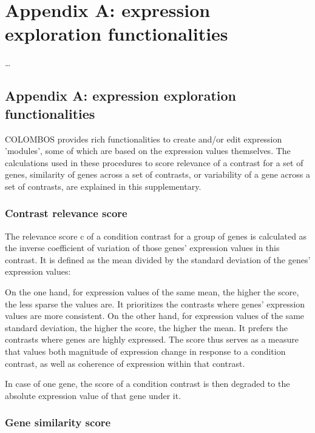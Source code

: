 \chapter{Appendix A: expression exploration functionalities}\label{ch:myappendix}

\ldots

\instructionsappendices


\section{Appendix A: expression exploration functionalities}

COLOMBOS provides rich functionalities to  create and/or edit expression 'modules', 
some of which are based on the expression values themselves.  The calculations used in 
these procedures to score relevance of a contrast for a set of genes, similarity of genes 
across a set of contrasts, or variability of a gene across a set of contrasts, are explained in this supplementary.  


\subsection{Contrast relevance score}
The  relevance  score  c  of a condition contrast for a group of genes is calculated as the 
inverse coefficient of variation of those genes’ expression values in this contrast. It is 
defined as the mean divided by the standard deviation of the genes’ expression values: 


 
On the one hand, for expression values of the same mean, the higher the score, the less 
sparse the values are. It prioritizes the contrasts where genes’ expression values are more 
consistent. On the other hand, for expression values of the same standard deviation, the 
higher the score, the higher the mean. It prefers the contrasts where genes are highly 
expressed. The score thus serves as a measure that values both magnitude of expression 
change in response to a condition contrast, as well as coherence of expression within that 
contrast.  

In case of one gene, the score of a condition contrast is then degraded to the absolute 
expression value of that gene under it.  


\subsection{Gene similarity score}


